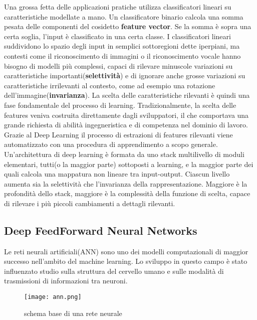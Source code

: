 Una grossa fetta delle applicazioni pratiche utilizza classificatori lineari su caratteristiche modellate a mano. 
Un classificatore binario calcola una somma pesata delle componenti del cosidetto \textbf{feature vector}. Se la somma è sopra una certa soglia, 
l'input è classificato in una certa classe. I classificatori lineari suddividono lo spazio degli input in semplici sottoregioni dette iperpiani, ma contesti come il riconoscimento di immagini o il riconoscimento vocale hanno
bisogno di modelli più complessi, capaci di rilevare  minuscole variazioni su caratteristiche importanti(\textbf{selettività}) e di ignorare anche grosse variazioni su caratteristiche irrilevanti al contesto, come ad esempio una rotazione dell'immagine(\textbf{invarianza}). La scelta delle caratteristiche rilevanti è quindi una
fase fondamentale del processo di learning. Tradizionalmente, la scelta delle features veniva costruita direttamente dagli sviluppatori, il che comportava una grande richiesta di abilità ingegneristica e di competenza nel dominio di lavoro.
Grazie al Deep  Learning  il processo di estrazioni di features rilevanti viene automatizzato con una procedura di apprendimento a scopo generale.
Un'architettura di deep learning è formata da uno stack multilivello di moduli elementari, tutti(o la maggior parte) sottoposti a learning, e la maggior parte dei quali
calcola una mappatura non lineare tra input-output. Ciascun livello aumenta sia la selettività che l'invarianza della rappresentazione. 
Maggiore è la profondità dello stack, maggiore è la complessità della funzione di scelta, capace di rilevare i più piccoli cambiamenti a dettagli rilevanti\cite{deep}.

\subsection{Deep FeedForward Neural Networks}
Le reti neurali artificiali(ANN) sono uno dei modelli computazionali di maggior successo nell'ambito del machine learning. Lo sviluppo in questo campo è stato influenzato 
studio sulla struttura del cervello umano e sulle modalità di trasmissioni di informazioni tra neuroni. 
\begin{figure}
  \texttt{[image: ann.png]}
  \caption{schema base di una rete neurale\cite{ann}}
  \label{fig:ann}
\end{figure}

